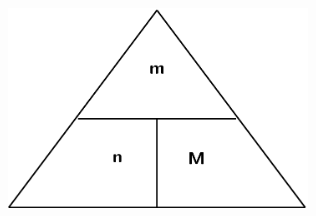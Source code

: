	\begin{figure}[H] %
    \begin{center}
    \label{m38717*id277616!!!underscore!!!media}\label{m38717*id277616!!!underscore!!!printimage}\includegraphics[width=300px]{col11305.imgs/m38717_CG11C6_001.png} %
        
      \vspace{2pt}
    \vspace{.1in}
    
    \end{center}

 \end{figure}   

    \addtocounter{footnote}{-0}
    
      \par 
\label{m38717*secfhsst!!!underscore!!!id409}\vspace{.5cm} 
      
